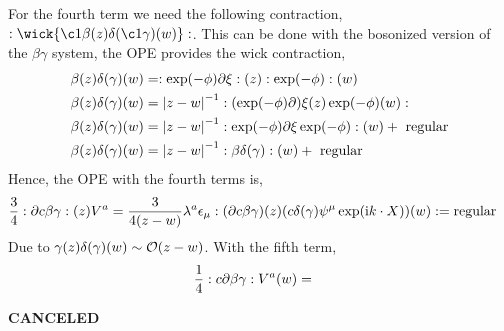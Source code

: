 For the fourth term we need the following contraction, $\cnord{\wick{\c1\beta(z)\delta\qty(\c1\gamma)(w)}}$. This can be done with the bosonized version 
of the $\beta\gamma$ system, the OPE provides the wick contraction,
\begin{align*}
    \beta(z)\delta\qty(\gamma)(w)&=:\exp(-\phi)\partial\xi:(z):\exp(-\phi):(w)\\
    \beta(z)\delta\qty(\gamma)(w)&=\abs{z-w}^{-1}:(\exp(-\phi)\partial)\xi(z)\exp(-\phi)(w):\\
    \beta(z)\delta\qty(\gamma)(w)&=\abs{z-w}^{-1}:\exp(-\phi)\partial\xi\exp(-\phi):(w)+\textnormal{ regular}\\
    \beta(z)\delta\qty(\gamma)(w)&=\abs{z-w}^{-1}:\beta\delta\qty(\gamma):(w)+\textnormal{ regular}
\end{align*}
Hence, the OPE with the fourth terms is,
\begin{align*}
    \frac34:\partial c\beta\gamma:(z)V^a&=\frac{3}{4(z-w)}\lambda^a\epsilon_\mu:(\partial c\beta\gamma)(z)(c\delta\qty(\gamma)\psi^\mu\exp(\textnormal{i} k\cdot X))(w):=\textnormal{regular}
\end{align*}
Due to $\gamma(z)\delta\qty(\gamma)(w)\sim\mathcal O\qty(z-w)$. With the fifth term,
\begin{align*}
    \frac14:c\partial\beta\gamma:V^a(w)&=
\end{align*}

\probitem{}

\textbf{CANCELED}

\probitem{}
\probitem{}